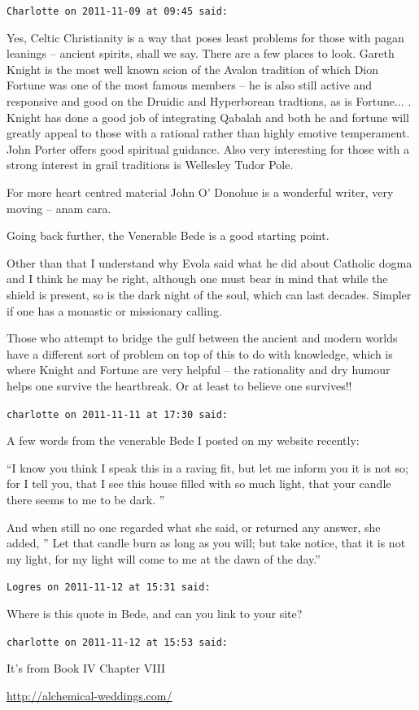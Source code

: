 \begin{footnotesize}
\begin{sffamily}
\hfill

\texttt{Charlotte on 2011-11-09 at 09:45 said:}

Yes, Celtic Christianity is a way that poses least problems for those with pagan leanings -- ancient spirits, shall we say. There are a few places to look. Gareth Knight is the most well known scion of the Avalon tradition of which Dion Fortune was one of the most famous members -- he is also still active and responsive and good on the Druidic and Hyperborean tradtions, as is Fortune... . Knight has done a good job of integrating Qabalah and both he and fortune will greatly appeal to those with a rational rather than highly emotive temperament. John Porter offers good spiritual guidance. Also very interesting for those with a strong interest in grail traditions is Wellesley Tudor Pole.

For more heart centred material John O' Donohue is a wonderful writer, very moving -- anam cara.

Going back further, the Venerable Bede is a good starting point.

Other than that I understand why Evola said what he did about Catholic dogma and I think he may be right, although one must bear in mind that while the shield is present, so is the dark night of the soul, which can last decades. Simpler if one has a monastic or missionary calling.

Those who attempt to bridge the gulf between the ancient and modern worlds have a different sort of problem on top of this to do with knowledge, which is where Knight and Fortune are very helpful -- the rationality and dry humour helps one survive the heartbreak. Or at least to believe one survives!!

\hfill

\texttt{charlotte on 2011-11-11 at 17:30 said:}

A few words from the venerable Bede I posted on my website recently:

``I know you think I speak this in a raving fit, but let me inform you it is not so; for I tell you, that I see this house filled with so much light, that your candle there seems to me to be dark. ''

And when still no one regarded what she said, or returned any answer, she added, '' Let that candle burn as long as you will; but take notice, that it is not my light, for my light will come to me at the dawn of the day.''

\hfill

\texttt{Logres on 2011-11-12 at 15:31 said:}

Where is this quote in Bede, and can you link to your site?

\hfill

\texttt{charlotte on 2011-11-12 at 15:53 said:}

It's from Book IV Chapter VIII

\url{http://alchemical-weddings.com/}



\hfill

\end{sffamily}
\end{footnotesize}

